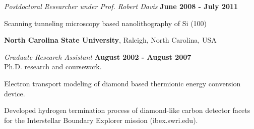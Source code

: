 \documentclass[letterpaper,margin,line]{res}
\newenvironment{list1}{
  \begin{list}{\ding{113}}{%
      \setlength{\itemsep}{0in}
      \setlength{\parsep}{0in} \setlength{\parskip}{0in}
      \setlength{\topsep}{0in} \setlength{\partopsep}{0in} 
      \setlength{\leftmargin}{0.17in}}}{\end{list}}
\begin{document}
\begin{resume}
\vspace{-.3cm}
{\em Postdoctoral Researcher under Prof. Robert Davis} \hfill {\bf June 2008 - July 2011}\\
\begin{list1}
\item[] Scanning tunneling microscopy based nanolithography of Si (100)
\end{list1}


{\bf North Carolina State University}, Raleigh, North Carolina, USA

\vspace{-.3cm}
{\em Graduate Research Assistant} \hfill {\bf August 2002 - August 2007}\\
Ph.D. research and coursework.
\begin{list1}
\item[] Electron transport modeling of diamond based thermionic energy conversion device.
\item[] Developed hydrogen termination process of diamond-like carbon detector facets for the Interstellar Boundary Explorer mission (ibex.swri.edu).
\end{list1}


\end{resume}
\end{document}

